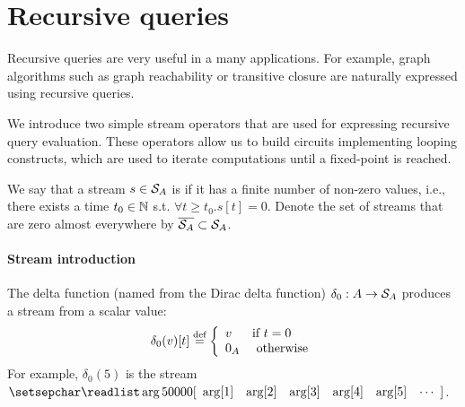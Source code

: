 \section{Recursive queries}\label{sec:recursion}

Recursive queries are very useful in a many applications.
For example, graph algorithms such as graph reachability
or transitive closure are naturally expressed using recursive queries.

We introduce two simple \dbsp stream operators that are used for
expressing recursive query evaluation.  These operators allow us
to build circuits implementing looping constructs, which
are used to iterate computations until a fixed-point is reached.

\begin{definition}\label{def:zae}
We say that a stream $s \in \mathcal{S}_{A}$ is  if it has a finite
number of non-zero values, i.e., there exists a time $t_0 \in \mathbb{N}$
s.t. $\forall t \geq t_0 . s[t] = 0$.
\noindent Denote the set of streams that are zero almost everywhere
by $\overline{\mathcal{S}_{A}} \subset \mathcal{S}_{A}$.
\end{definition}

\paragraph{Stream introduction}

The delta function (named from the Dirac delta function) $\delta_0 : A \rightarrow \mathcal{S}_{A}$
produces a stream from a scalar value:
$$\delta_0(v)[t] \stackrel{\textrm{\scriptsize def}}{=} \left\{
\begin{array}{ll}
  v & \mbox{if } t = 0 \\
  0_A & \mbox{ otherwise}
\end{array}
\right.
$$
\ifstreamexamples
For example, $\delta_0(5)$ is the stream $\sv{5 0 0 0 0}$.
\fi

\begin{comment}
Here is a diagram showing a $\delta_0$ operator; note that the input is a scalar value,
while the output is a stream:

\begin{tikzpicture}[auto,node distance=1cm,>=latex]
    \node[] (input) {$i$};
    \node[block, right of=input] (delta) {$\delta_0$};
    \node[right of=delta] (output) {$o$};
    \draw[->] (input) -- (delta);
    \draw[->] (delta) -- (output);
\end{tikzpicture}
\end{comment}

